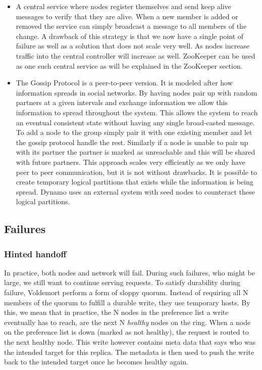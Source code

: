\begin{itemize}
\item A central service where nodes register themselves and send keep alive messages to verify that they are alive. When a new member is added or removed the service can simply broadcast a message to all members of the change. A drawback of this strategy is that we now have a single point of failure as well as a solution that does not scale very well. As nodes increase traffic into the central controller will increase as well. ZooKeeper can be used as one such central service as will be explained in the ZooKeeper section.
\item The Gossip Protocol is a peer-to-peer version. It is modeled after how information spreads in social networks. By having nodes pair up with random partners at a given intervals and exchange information we allow this information to spread throughout the system. This allows the system to reach an eventual consistent state without having any single broad-casted message. To add a node to the group simply pair it with one existing member and let the gossip protocol handle the rest. Similarly if a node is unable to pair up with its partner the partner is marked as unreachable and this will be shared with future partners. This approach scales very efficiently as we only have peer to peer communication, but it is not without drawbacks. It is possible to create temporary logical partitions that exists while the information is being spread. Dynamo uses an external system with seed nodes to counteract these logical partitions. 

\end{itemize}

\subsection{Failures}

\subsubsection{Hinted handoff}
In practice, both nodes and network will fail. During such failures, who might be large, we still want to continue serving requests.
To satisfy durability during failure, Voldemort perform a form of sloppy quorum. 
Instead of requiring all N members of the quorum to fulfill a durable write, they use temporary hosts. 
By this, we mean that in practice, the N nodes in the preference list a write eventually has to reach, are the next N \emph{healthy} nodes on the ring.
When a node on the preference list is down (marked as not healthy), the request is routed to the next healthy node. 
This write however contains meta data that says who was the intended target for this replica. 
The metadata is then used to push the write back to the intended target once he becomes healthy again.

